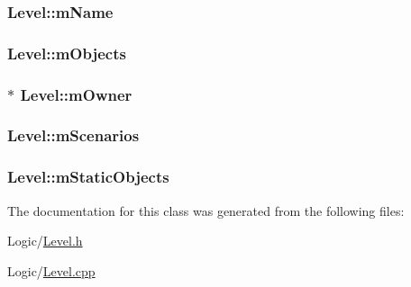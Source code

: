 \subsubsection[{\texorpdfstring{m\+Name}{mName}}]{ Level\+::m\+Name\hspace{0.3cm}{\ttfamily [private]}}\hypertarget{classLevel_ae33d8a4a8a50bf09ce19ff784509e77b}{}\label{classLevel_ae33d8a4a8a50bf09ce19ff784509e77b}
\subsubsection[{\texorpdfstring{m\+Objects}{mObjects}}]{ Level\+::m\+Objects\hspace{0.3cm}{\ttfamily [private]}}\hypertarget{classLevel_a66c3ffb86f6e61570f833046e7994d43}{}\label{classLevel_a66c3ffb86f6e61570f833046e7994d43}
\subsubsection[{\texorpdfstring{m\+Owner}{mOwner}}]{$\ast$ Level\+::m\+Owner\hspace{0.3cm}{\ttfamily [private]}}\hypertarget{classLevel_a577a9c893ac40f3b612f1d672d244338}{}\label{classLevel_a577a9c893ac40f3b612f1d672d244338}
\subsubsection[{\texorpdfstring{m\+Scenarios}{mScenarios}}]{ Level\+::m\+Scenarios\hspace{0.3cm}{\ttfamily [private]}}\hypertarget{classLevel_a97db6fa7099a710cf9c953f41ea3f478}{}\label{classLevel_a97db6fa7099a710cf9c953f41ea3f478}
\subsubsection[{\texorpdfstring{m\+Static\+Objects}{mStaticObjects}}]{ Level\+::m\+Static\+Objects\hspace{0.3cm}{\ttfamily [private]}}\hypertarget{classLevel_afce9aca707faf2694e54e50f41feb035}{}\label{classLevel_afce9aca707faf2694e54e50f41feb035}


The documentation for this class was generated from the following files\+:\begin{DoxyCompactItemize}
\item 
Logic/\hyperlink{Level_8h}{Level.\+h}\item 
Logic/\hyperlink{Level_8cpp}{Level.\+cpp}\end{DoxyCompactItemize}
